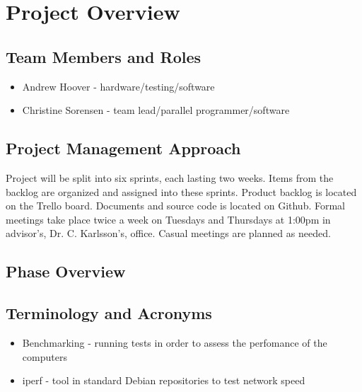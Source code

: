 

\chapter{Project Overview}



\section{Team Members and Roles}
\begin{itemize}
	\item Andrew Hoover - hardware/testing/software 
	\item Christine Sorensen - team lead/parallel programmer/software
\end{itemize}

\section{Project  Management Approach}
Project will be split into six sprints, each lasting two weeks. Items from the backlog are organized and assigned into these sprints. \newline \newline Product backlog is located on the Trello board. Documents and source code is located on Github. \newline \newline Formal meetings take place twice a week on Tuesdays and Thursdays at 1:00pm in advisor's, Dr. C. Karlsson's, office. Casual meetings are planned as needed.

\section{Phase  Overview}



\section{Terminology and Acronyms}
\begin{itemize}
	\item Benchmarking - running tests in order to assess the perfomance of the computers
	\item iperf - tool in standard Debian repositories to test network speed
\end{itemize}


